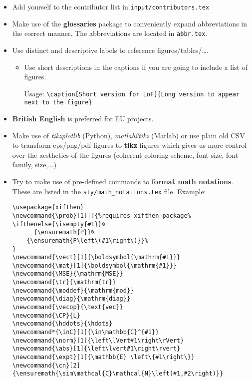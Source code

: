 \begin{itemize}
    \item Add yourself to the contributor list in \texttt{input/contributors.tex}
    \item Make use of the \textbf{glossaries} package to conveniently expand abbreviations in the correct manner. The abbreviations are located in \texttt{abbr.tex}.
    \item Use distinct and descriptive labels to reference figures/tables/\ldots. 
    \begin{itemize}
        \item Use short descriptions in the captions if you are going to include a list of figures.
        
        Usage:
        \texttt{\textbackslash caption[Short version for LoF]\{Long version to appear next to the figure\}}
    \end{itemize}
\item \textbf{British English} is preferred for EU projects.
\item Make use of \textit{tikzplotlib} (Python),  \textit{matlab2tikz} (Matlab) or use plain old CSV to transform eps/png/pdf figures to \textbf{tikz} figures which gives us more control over the aesthetics of the figures (coherent coloring scheme, font size, font family, size,...)
\item Try to make use of pre-defined commands to \textbf{format math notations}. These are listed in the \texttt{sty/math\_notations.tex} file. Example:
\begin{verbatim}
\usepackage{xifthen}
\newcommand{\prob}[1][]{%requires xifthen package%
\ifthenelse{\isempty{#1}}%
      {\ensuremath{P}}%
    {\ensuremath{P\left\(#1\right\)}}%
}
\newcommand{\vect}[1]{\boldsymbol{\mathrm{#1}}}
\newcommand{\mat}[1]{\boldsymbol{\mathrm{#1}}}
\newcommand{\MSE}{\mathrm{MSE}}
\newcommand{\tr}{\mathrm{tr}}
\newcommand{\moddef}{\mathrm{mod}}
\newcommand{\diag}{\mathrm{diag}}
\newcommand{\vecop}{\text{vec}}
\newcommand{\CP}{L}
\newcommand{\hddots}{\hdots}
\newcommand*{\inC}[1]{\in\mathbb{C}^{#1}}
\newcommand{\norm}[1]{\left\lVert#1\right\rVert}
\newcommand{\abs}[1]{\left\lvert#1\right\rvert}
\newcommand{\expt}[1]{\mathbb{E} \left\{#1\right\}}
\newcommand{\cn}[2]{\ensuremath{\sim\mathcal{C}\mathcal{N}\left(#1,#2\right)}}
\end{verbatim}
\end{itemize}

